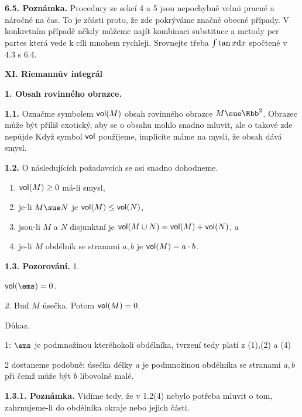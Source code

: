 \documentclass[12pt]{article}
\begin{document}
{\bigskip

{\bf 6.5. Poznámka.} Procedury ze sekcí 4 a 5 jsou nepochybně velmi pracné a náročné na čas. To je zčásti proto, že zde
pokrýváme značně obecné případy. V konkretním případě někdy můžeme najít kombinaci substituce a metody per partes která vede k cíli mnohem rychleji. Srovnejte třeba
 $\int\tan x\d x$ spočtené v 4.3 s 6.4.

\newpage


   
    \centerline{\Large\bf XI. Riemannův integrál} 
 
 \vskip10mm
 
 
 \def\d{\text{d}}
 
 
 
 {\large\bf 1. Obsah rovinného obrazce.}
 
 \def\vol{\text{\sf vol}}
 
 \bigskip
 
 {\bf 1.1.} Označme symbolem $\vol(M)$ obsah rovinného obrazce $M\sue \Rbb^2$. Obrazec může být příliš exotický, aby se o obsahu mohlo snadno mluvit, ale o takové zde nepůjde
Když symbol $\vol$ použijeme, implicite máme na mysli, že obsah dává smysl.
 
 
 
 \bigskip
 
 {\bf 1.2.} O následujících požadavcích se asi snadno dohodneme.
 \begin{enumerate}
 \item $\vol(M)\geq 0$ má-li smysl,
 \item je-li $M\sue N$ je $\vol(M)\leq\vol(N)$,
 \item jsou-li $M$ a $N$ disjunktní je $\vol(M\cup N)=\vol(M)+\vol(N)$, a
 \item je-li $M$ obdélník se stranami $a,b$ je $\vol(M)=a\cdot b$.
 \end{enumerate}
 
 \bigskip
 
 {\bf 1.3. Pozorování.} 1. {\em $\vol(\ems)=0$.
 
 {\em 2.} Buď $M$ úsečka. Potom $\vol(M)=0$.
 
 Důkaz.} 1: $\ems$ je podmnožinou kteréhokoli obdélníka,
 tvrzení tedy platí z (1),(2) a (4)
 
 2 dostaneme podobně: úsečka délky $a$ je podmnožinou obdélníka se stranami $a,b$
 při čemž může být $b$ libovolně malé.\sq
 
 \medskip
 
 {\bf 1.3.1. Poznámka.} Vidíme tedy, že 
 v 1.2(4) nebylo potřeba mluvit o tom, zahrnujeme-li do obdélníka okraje nebo jejich části.
 
}
\end{document}
